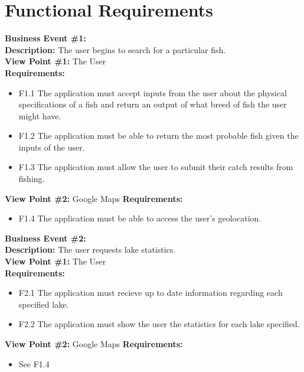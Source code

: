 \documentclass{article}
\begin{document}
\section{Functional Requirements}

	\noindent\textbf{Business Event \#1:} \\
	\textbf{Description:} The user begins to search for a particular fish. \\
	\textbf{View Point \#1:} The User \\
	\textbf{Requirements:}
	\begin{itemize}
		\item F1.1 The application must accept inputs from the user about the physical specifications of a fish and return an output of what breed of fish the user might have.
		\item F1.2 The application must be able to return the most probable fish given the inputs of the user.
		\item F1.3 The application must allow the user to submit their catch results from fishing.
	\end{itemize}
	\textbf{View Point \#2:} Google Maps
	\textbf{Requirements:}
	\begin{itemize}
		\item F1.4 The application must be able to access the user's geolocation.
	\end{itemize}
	

	\noindent\textbf{Business Event \#2:} \\
	\textbf{Description:} The user requests lake statistics. \\
	\textbf{View Point \#1:} The User \\
	\textbf{Requirements:}
	\begin{itemize}
		\item F2.1 The application must recieve up to date information regarding each specified lake.
		\item F2.2 The application must show the user the statistics for each lake specified.
	\end{itemize}
	\textbf{View Point \#2:} Google Maps
	\textbf{Requirements:}
	\begin{itemize}
		\item See F1.4
	\end{itemize}
\end{document}
